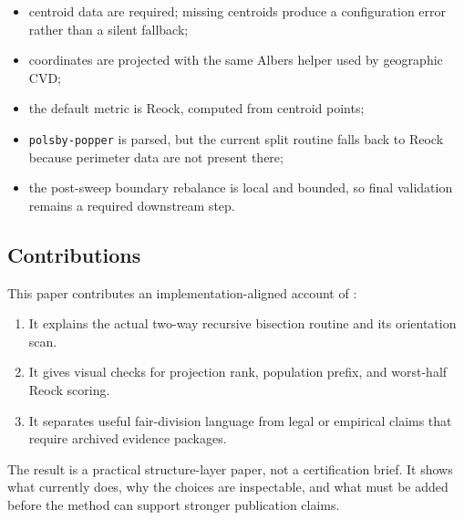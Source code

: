 \begin{itemize}
\item centroid data are required; missing centroids produce a configuration
  error rather than a silent fallback;
\item coordinates are projected with the same Albers helper used by geographic
  CVD;
\item the default metric is Reock, computed from centroid points;
\item \texttt{polsby-popper} is parsed, but the current split routine falls
  back to Reock because perimeter data are not present there;
\item the post-sweep boundary rebalance is local and bounded, so final
  validation remains a required downstream step.
\end{itemize}

\subsection{Contributions}

This paper contributes an implementation-aligned account of \mka{}:

\begin{enumerate}
\item It explains the actual two-way recursive bisection routine and its
  orientation scan.
\item It gives visual checks for projection rank, population prefix, and
  worst-half Reock scoring.
\item It separates useful fair-division language from legal or empirical claims
  that require archived evidence packages.
\end{enumerate}

The result is a practical structure-layer paper, not a certification brief. It
shows what \mka{} currently does, why the choices are inspectable, and what
must be added before the method can support stronger publication claims.
